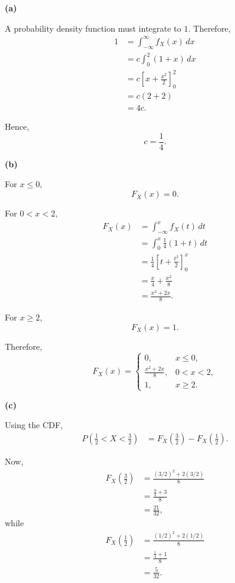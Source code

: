 \documentclass[11pt]{article}
\begin{document}
\begin{solutionbox}

\textbf{(a)}

A probability density function must integrate to $1$. Therefore,
\begin{align*}
1
&=
\int_{-\infty}^{\infty} f_X(x)\,dx\\
&=
c\int_0^2(1+x)\,dx\\
&=
c\left[x+\frac{x^2}{2}\right]_0^2\\
&=
c(2+2)\\
&=
4c.
\end{align*}

Hence,
\[
c=\frac14.
\]


\textbf{(b)}

For $x\leq0$,
\[
F_X(x)=0.
\]

For $0<x<2$,
\begin{align*}
F_X(x)
&=
\int_{-\infty}^{x}f_X(t)\,dt\\
&=
\int_0^x\frac14(1+t)\,dt\\
&=
\frac14
\left[t+\frac{t^2}{2}\right]_0^x\\
&=
\frac{x}{4}+\frac{x^2}{8}\\
&=
\frac{x^2+2x}{8}.
\end{align*}

For $x\geq2$,
\[
F_X(x)=1.
\]

Therefore,
\[
F_X(x)
=
\begin{cases}
0, & x\leq0,\\[2mm]
\displaystyle \frac{x^2+2x}{8}, & 0<x<2,\\[3mm]
1, & x\geq2.
\end{cases}
\]


\textbf{(c)}

Using the CDF,
\begin{align*}
P\left(\frac12<X<\frac32\right)
&=
F_X\left(\frac32\right)
-
F_X\left(\frac12\right).
\end{align*}

Now,
\begin{align*}
F_X\left(\frac32\right)
&=
\frac{
(3/2)^2+2(3/2)
}{8}\\
&=
\frac{\frac94+3}{8}\\
&=
\frac{21}{32},
\end{align*}
while
\begin{align*}
F_X\left(\frac12\right)
&=
\frac{
(1/2)^2+2(1/2)
}{8}\\
&=
\frac{\frac14+1}{8}\\
&=
\frac{5}{32}.
\end{align*}


\end{solutionbox}
\end{document}
